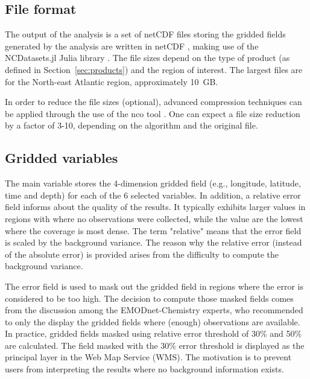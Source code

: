\documentclass[essd, manuscript]{copernicus}
\begin{document}
\subsection{File format}

The output of the analysis is a set of netCDF files storing the gridded fields generated by the analysis are written in netCDF \citep{Rew1990,Brown1993,Rew2006}, making use of the NCDatasets.jl Julia library \citep{Barth2024}. The file sizes depend on the type of product (as defined in Section~\ref{sec:products}) and the region of interest. The largest files are for the North-east Atlantic region, approximately 10~\unit{GB}.

In order to reduce the file sizes (optional), advanced compression techniques \citep{Silver2017,Zender2016} can be applied through the use of the nco tool \citep[netCDF operators,][]{Zender2008}. One can expect a file size reduction by a factor of 3-10, depending on the algorithm and the original file.

\subsection{Gridded variables}

The main variable stores the 4-dimension gridded field (e.g., longitude, latitude, time and depth) for each of the 6 selected variables. In addition, a relative error field informs about the quality of the results. It typically exhibits larger values in regions with where no observations were collected, while the value are the lowest where the coverage is most dense. The term "relative" means that the error field is scaled by the background variance. The reason why the relative error (instead of the absolute error) is provided arises from the difficulty to compute the background variance.  

The error field is used to mask out the gridded field in regions where the error is considered to be too high. The decision to compute those masked fields comes from the discussion among the EMODnet-Chemistry experts, who recommended to only the display the gridded fields where (enough) observations are available. In practice, gridded fields masked using relative error threshold of 30\% and 50\% are calculated. The field masked with the 30\% error threshold is displayed as the principal layer in the Web Map Service (WMS). The motivation is to prevent users from interpreting the results where no background information exists. 
\end{document}
